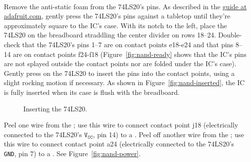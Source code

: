 \disconnect\

Remove the anti-static foam from the 74LS20's pins.
As described in the \href{https://learn.adafruit.com/breadboards-for-beginners/breadboard-usage}{guide at adafruit.com}, gently press the 74LS20's pins against a tabletop until they're approximately square to the IC's case.
With its notch to the left, place the 74LS20 on the breadboard straddling the center divider on rows 18--24.
Double-check that the 74LS20's pins 1--7 are on contact points e18-e24 and that pins 8--14 are on contact points f24-f18 (Figure~\ref{fig:nand-ready} shows that the IC's pins are not splayed outside the contact points nor are folded under the IC's case).
Gently press on the 74LS20 to insert the pins into the contact points, using a slight rocking motion if necessary.
As shown in Figure~\ref{fig:nand-inserted}, the IC is fully inserted when its case is flush with the breadboard.

\begin{figure}
    \centering
    \hfil
    \caption{Inserting the 74LS20.}
\end{figure}

Peel one wire from the \rainbow;
use this wire to connect contact point j18 (electrically connected to the 74LS20's $\mathtt{V_{CC}}$, pin 14) to a \power.
Peel off another wire from the \rainbow;
use this wire to connect contact point a24 (electrically connected to the 74LS20's \texttt{GND}, pin 7) to a \ground.
See Figure~\ref{fig:nand-power}.

